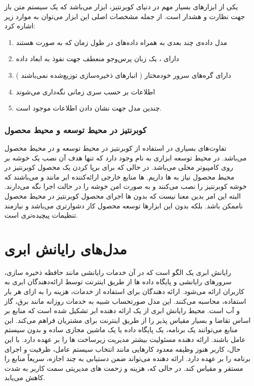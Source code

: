 یکی از ابزارهای بسیار مهم در دنیای کوبرنتیز، ابزار
می‌باشد که یک سیستم متن باز جهت نظارت و هشدار است. از جمله مشخصات اصلی این ابزار می‌توان به موارد زیر اشاره کرد:
\cite{prometheus_overview}

\begin{enumerate}
	\item
	مدل داده‌ی چند بعدی به همراه داده‌های در طول زمان که به صورت
	هستند
	\item
	دارای
	، یک زبان پرس‌‌و‌جو  منعطف جهت نفوذ به ابعاد داده
	\item
	دارای گره‌های سرور خودمختار ( انبارهای ذخیره‌سازی توزیع‌شده نمی‌باشند )
	\item
	اطلاعات بر حسب سری زمانی نگه‌داری می‌شوند
	\item
	چندین مدل جهت نشان دادن اطلاعات موجود است. 
\end{enumerate}


\subsubsection{کوبرنتیز در محیط توسعه و محیط محصول}
تفاوت‌های بسیاری در استفاده از کوبرنتیز در محیط توسعه  و در محیط محصول می‌باشد. در محیط توسعه ابزاری به نام
وجود دارد که تنها هدف آن نصب یک خوشه بر روی کامپیوتر محلی می‌باشد. در حالی که برای برپا کردن یک محصول کوبرنتیز در محیط محصول نیاز به
ها داریم.
ها منابع خارجی ارائه‌کننده ابر مانند
و
می‌باشند که خوشه کوبرنتیز را نصب می‌کنند و به صورت امن خوشه را در حالت اجرا نگه می‌دارند. البته این امر بدین معنا نیست که بدون
ها اجرای محصول کوبرنتیز در محیط محصول ناممکن باشد. بلکه بدون این ابزارها توسعه محصول کار دشوارتری می‌باشد و نیازمند تنظیمات پیچیده‌تری است.

\section{مدل‌های رایانش ابری}

رایانش ابری یک الگو است که در آن خدمات رایانشی مانند حافظه ذخیره سازی، سرورهای رایانشی و پایگاه داده ها از طریق اینترنت توسط ارائه‌دهندگان ابری به کاربران ارائه می‌شود. ارائه دهندگان برای استفاده از خدمات، هزینه را به ازای هر بار استفاده، محاسبه می‌کنند. این مدل صورتحساب شبیه به خدمات روزانه مانند برق، گاز و آب است. محیط رایانش ابری از یک ارائه دهنده ابر تشکیل شده است که منابع بر اساس تقاضا و بسیار مقیاس پذیر را از طریق اینترنت برای مشتریان فراهم می‌کند. این منابع می‌توانند یک برنامه، یک پایگاه داده یا یک ماشین مجازی ساده و بدون سیستم عامل باشند. ارائه دهنده مسئولیت بیشتر مدیریت زیرساخت ها را بر عهده دارد. با این حال، کاربر هنوز وظیفه معدود کارهایی مانند انتخاب سیستم عامل، ظرفیت و اجرای برنامه را بر عهده دارد. ارائه دهنده می‌تواند ضمن دستیابی به چند اجازه، سریعاً منابع را مستقر و مقیاس کند. در حالی که، هزینه و زحمت های مدیریتی سمت کاربر به شدت کاهش می‌یابد.


